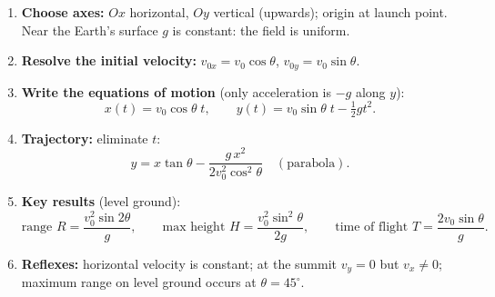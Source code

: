 \documentclass[11pt]{article}
\newcommand{\cle}[1]{{\popxbold\color{popdark}#1}}
\begin{document}
\begin{methode}
\begin{enumerate}
\item \textbf{Choose axes:} $Ox$ horizontal, $Oy$ vertical (upwards); origin at launch point. Near the Earth's surface $g$ is constant: the field is \cle{uniform}.
\item \textbf{Resolve the initial velocity:} $v_{0x} = v_0\cos\theta$, $v_{0y} = v_0\sin\theta$.
\item \textbf{Write the equations of motion} (only acceleration is $-g$ along $y$):
\[ x(t) = v_0\cos\theta\; t, \qquad y(t) = v_0\sin\theta\; t - \tfrac{1}{2}gt^{2}. \]
\item \textbf{Trajectory:} eliminate $t$:
\[ y = x\tan\theta - \frac{g\,x^{2}}{2v_0^{2}\cos^{2}\theta} \quad (\text{parabola}). \]
\item \textbf{Key results} (level ground):
\[ \text{range } R = \frac{v_0^{2}\sin 2\theta}{g}, \qquad \text{max height } H = \frac{v_0^{2}\sin^{2}\theta}{2g}, \qquad \text{time of flight } T = \frac{2v_0\sin\theta}{g}. \]
\item \textbf{Reflexes:} horizontal velocity is constant; at the summit $v_y = 0$ but $v_x \neq 0$; maximum range on level ground occurs at $\theta = 45^{\circ}$.
\end{enumerate}
\end{methode}
\end{document}
